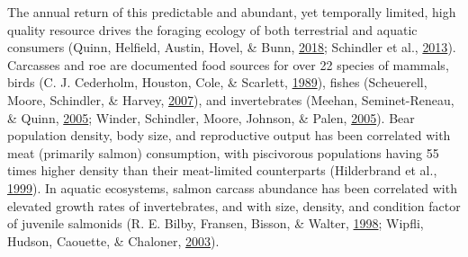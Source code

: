 \documentclass [11pt, proquest] {uwthesis}[2015/03/03]
\begin{document}
The annual return of this predictable and abundant, yet temporally
limited, high quality resource drives the foraging ecology of both
terrestrial and aquatic consumers (Quinn, Helfield, Austin, Hovel, \&
Bunn, \protect\hyperlink{ref-Quinn2018}{2018}; Schindler et al.,
\protect\hyperlink{ref-Schindler2013}{2013}). Carcasses and roe are
documented food sources for over 22 species of mammals, birds (C. J.
Cederholm, Houston, Cole, \& Scarlett,
\protect\hyperlink{ref-Cederholm1989}{1989}), fishes (Scheuerell, Moore,
Schindler, \& Harvey, \protect\hyperlink{ref-Scheuerell2007}{2007}), and
invertebrates (Meehan, Seminet-Reneau, \& Quinn,
\protect\hyperlink{ref-Meehan2005}{2005}; Winder, Schindler, Moore,
Johnson, \& Palen, \protect\hyperlink{ref-Winder2005}{2005}). Bear
population density, body size, and reproductive output has been
correlated with meat (primarily salmon) consumption, with piscivorous
populations having 55 times higher density than their meat-limited
counterparts (Hilderbrand et al.,
\protect\hyperlink{ref-Hilderbrand1999}{1999}). In aquatic ecosystems,
salmon carcass abundance has been correlated with elevated growth rates
of invertebrates, and with size, density, and condition factor of
juvenile salmonids (R. E. Bilby, Fransen, Bisson, \& Walter,
\protect\hyperlink{ref-Bilby1998}{1998}; Wipfli, Hudson, Caouette, \&
Chaloner, \protect\hyperlink{ref-Wipfli2003}{2003}).
\end{document}
